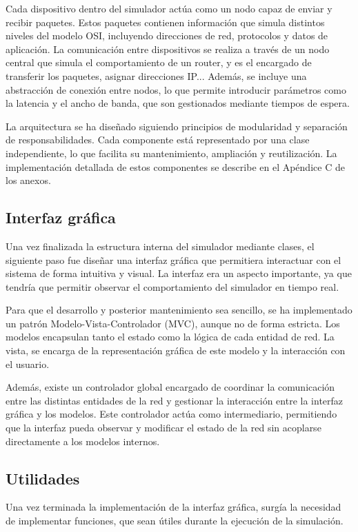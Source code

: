 Cada dispositivo dentro del simulador actúa como un nodo capaz de enviar y recibir paquetes. Estos paquetes contienen información que simula distintos niveles del modelo OSI, incluyendo direcciones de red, protocolos y datos de aplicación. La comunicación entre dispositivos se realiza a través de un nodo central que simula el comportamiento de un router, y es el encargado de transferir los paquetes, asignar direcciones IP... Además, se incluye una abstracción de conexión entre nodos, lo que permite introducir parámetros como la latencia y el ancho de banda, que son gestionados mediante tiempos de espera.

La arquitectura se ha diseñado siguiendo principios de modularidad y separación de responsabilidades. Cada componente está representado por una clase independiente, lo que facilita su mantenimiento, ampliación y reutilización. La implementación detallada de estos componentes se describe en el Apéndice C de los anexos.

\subsection{Interfaz gráfica}
\label{subsec:InterfazGrafica}
Una vez finalizada la estructura interna del simulador mediante clases, el siguiente paso fue diseñar una interfaz gráfica que permitiera interactuar con el sistema de forma intuitiva y visual. La interfaz era un aspecto importante, ya que tendría que permitir observar el comportamiento del simulador en tiempo real.

Para que el desarrollo y posterior mantenimiento sea sencillo, se ha implementado un patrón Modelo-Vista-Controlador (MVC), aunque no de forma estricta. Los modelos encapsulan tanto el estado como la lógica de cada entidad de red. La vista, se encarga de la representación gráfica de este modelo y la interacción con el usuario.

Además, existe un controlador global encargado de coordinar la comunicación entre las distintas entidades de la red y gestionar la interacción entre la interfaz gráfica y los modelos. Este controlador actúa como intermediario, permitiendo que la interfaz pueda observar y modificar el estado de la red sin acoplarse directamente a los modelos internos.

\subsection{Utilidades}
\label{subsec:Utilidades}
Una vez terminada la implementación de la interfaz gráfica, surgía la necesidad de implementar funciones, que sean útiles durante la ejecución de la simulación.

